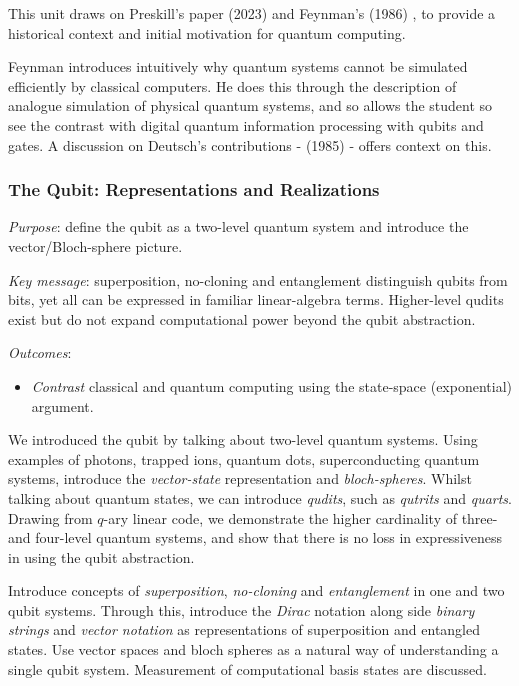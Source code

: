 This unit draws on Preskill's paper  \cite{Preskill:2023} (2023)
and Feynman's  (1986) \cite{Feynman:1986}, 
to provide a historical context and initial motivation for quantum computing.

Feynman introduces intuitively why quantum systems cannot be simulated efficiently by classical computers.
He does this through the description of analogue simulation of physical quantum systems, 
and so allows the student so see the contrast with digital quantum information processing with qubits and gates.
A discussion on Deutsch's contributions -  \cite{Deutsch:1985} (1985) - offers context on this.


\subsubsection*{The Qubit: Representations and Realizations}

\emph{Purpose}: define the qubit as a two-level quantum system and introduce the vector/Bloch-sphere picture.

\emph{Key message}: superposition, no-cloning and entanglement distinguish qubits from bits, 
yet all can be expressed in familiar linear-algebra terms. 
Higher-level qudits exist but do not expand computational power beyond the qubit abstraction.

\emph{Outcomes}:
\begin{itemize}
	\item \emph{Contrast} classical and quantum computing using the state-space (exponential) argument.
\end{itemize}

We introduced the qubit by talking about two-level quantum systems.
Using examples of photons, trapped ions, quantum dots, superconducting quantum systems, 
introduce the \emph{vector-state} representation and \emph{bloch-spheres}.
Whilst talking about quantum states, we can introduce \emph{qudits}, such as \emph{qutrits} and \emph{quarts}.
Drawing from $q$-ary linear code, we demonstrate the higher cardinality of three- and four-level quantum systems,
and show that there is no loss in expressiveness in using the qubit abstraction.

Introduce concepts of \emph{superposition}, \emph{no-cloning} and \emph{entanglement} in one and two qubit systems.
Through this, introduce the \emph{Dirac} notation along side \emph{binary strings} and \emph{vector notation}
as representations of superposition and entangled states.
Use vector spaces and bloch spheres as a natural way of understanding a single qubit system.
Measurement of computational basis states are discussed.

